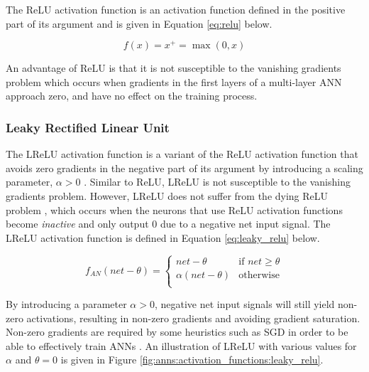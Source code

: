The \acf{ReLU} activation function is an activation function defined in the positive part of its argument and is given in Equation \eqref{eq:relu} below.

\begin{equation}
    f(x) = x^{+} = \max(0,x)
    \label{eq:relu}
\end{equation}

\noindent
An advantage of \acs{ReLU} is that it is not susceptible to the vanishing gradients problem \cite{ref:xu:2015, ref:maksutov:2018} which occurs when gradients in the first layers of a multi-layer \acs{ANN} approach zero, and have no effect on the training process.


\subsubsection{Leaky Rectified Linear Unit}\label{sec:anns:an:act_functions:leaky_relu}

The \acf{LReLU} activation function is a variant of the \acs{ReLU} activation function that avoids zero gradients in the negative part of its argument by introducing a scaling parameter, $\alpha > 0$ \cite{ref:xu:2015}. Similar to \acs{ReLU}, \acs{LReLU} is not susceptible to the vanishing gradients problem. However, \acs{LReLU} does not suffer from the dying \acs{ReLU} problem \cite{ref:agarap:2018}, which occurs when the neurons that use \acs{ReLU} activation functions become \textit{inactive} and only output $0$ due to a negative net input signal. The \acs{LReLU} activation function is defined in Equation \eqref{eq:leaky_relu} below.

\begin{equation}
    f_{AN}(net - \theta) =
    \begin{cases}
        net - \theta         & \text{if $net \geq \theta $} \\
        \alpha(net - \theta) & \text{otherwise}             \\
    \end{cases}
    \label{eq:leaky_relu}
\end{equation}

\noindent
By introducing a parameter $\alpha > 0$, negative net input signals will still yield non-zero activations, resulting in non-zero gradients and avoiding gradient saturation. Non-zero gradients are required by some heuristics such as \ac{SGD} in order to be able to effectively train \acp{ANN} \cite{ref:hanin:2018}. An illustration of \acs{LReLU} with various values for $\alpha$ and $\theta = 0$ is given in Figure \ref{fig:anns:activation_functions:leaky_relu}.

